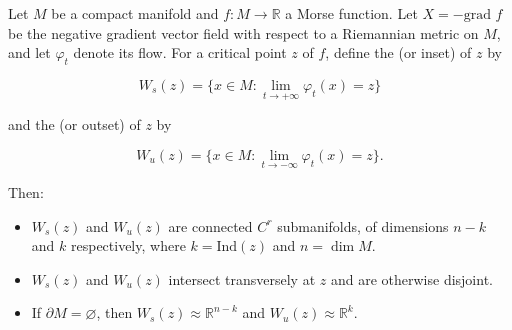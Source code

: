 Let $M$ be a compact manifold and $f: M \rightarrow \mathbb{R}$ a Morse function. Let $X = -\text{grad } f$ be the negative gradient vector field with respect to a Riemannian metric on $M$, and let $\varphi_t$ denote its flow. For a critical point $z$ of $f$, define the  (or inset) of $z$ by

$$W_s(z) = \{x \in M : \lim_{t \to +\infty} \varphi_t(x) = z\}$$

and the  (or outset) of $z$ by

$$W_u(z) = \{x \in M : \lim_{t \to -\infty} \varphi_t(x) = z\}.$$

Then:
\begin{itemize}
\item[(a)] $W_s(z)$ and $W_u(z)$ are connected $C^r$ submanifolds, of dimensions $n - k$ and $k$ respectively, where $k = \text{Ind}(z)$ and $n = \dim M$.
\item[(b)] $W_s(z)$ and $W_u(z)$ intersect transversely at $z$ and are otherwise disjoint.
\item[(c)] If $\partial M = \varnothing$, then $W_s(z) \approx \mathbb{R}^{n-k}$ and $W_u(z) \approx \mathbb{R}^k$.
\end{itemize}
